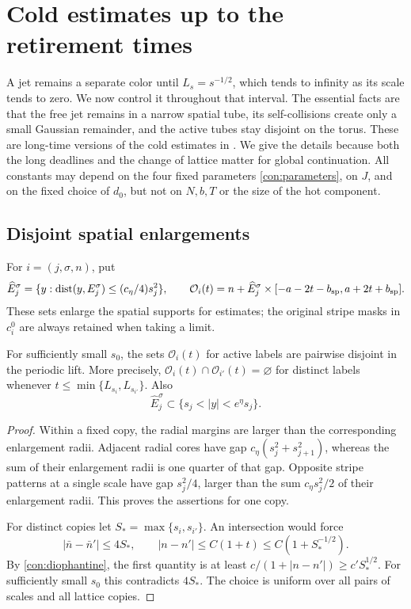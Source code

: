\section{Cold estimates up to the retirement times}
\label{sec:cold}

A jet remains a separate color until \(L_s=s^{-1/2}\), which tends to
infinity as its scale tends to zero.  We now control it throughout that
interval.  The essential facts are that the free jet remains in a
narrow spatial tube, its self-collisions create only a small Gaussian
remainder, and the active tubes stay disjoint on the torus.  These are
long-time versions of the cold estimates in
\cite[Section 4]{OpenAIPeriodic}.  We give the details because both the
long deadlines and the change of lattice matter for global continuation.
All constants may depend on the four fixed parameters
\eqref{con:parameters}, on \(J\), and on the fixed choice of \(d_0\),
but not on \(N,b,T\) or the size of the hot component.

\subsection{Disjoint spatial enlargements}

For \(i=(j,\sigma,n)\), put
\begin{equation}
 \widehat E_j^\sigma
   =\{y:\operatorname{dist}(y,E_j^\sigma)\le(c_\eta/4)s_j^2\},\qquad
 \mathcal O_i(t)=n+\widehat E_j^\sigma\times
     [-a-2t-b_{\mathrm{sp}},a+2t+b_{\mathrm{sp}}].
 \label{cold:enlargements}
\end{equation}
These sets enlarge the spatial supports for estimates; the original
stripe masks in \(c_i^0\) are always retained when taking a limit.

\begin{lemma}\label{cold:geometry}
For sufficiently small \(s_0\), the sets \(\mathcal O_i(t)\) for
active labels are pairwise disjoint in the periodic lift.  More
precisely, \(\mathcal O_i(t)\cap\mathcal O_{i'}(t)=\varnothing\)
for distinct labels whenever
\(t\le\min\{L_{s_i},L_{s_{i'}}\}\).  Also
\[
 \widehat E_j^\sigma\subset\{s_j<|y|<e^\eta s_j\}.
\]
\end{lemma}
\begin{proof}
Within a fixed copy, the radial margins are larger than the
corresponding enlargement radii.  Adjacent radial cores have gap
\(c_\eta(s_j^2+s_{j+1}^2)\), whereas the sum of their enlargement
radii is one quarter of that gap.  Opposite stripe patterns at a
single scale have gap \(s_j^2/4\), larger than the sum
\(c_\eta s_j^2/2\) of their enlargement radii.  This proves the
assertions for one copy.

For distinct copies let \(S_* =\max\{s_i,s_{i'}\}\).  An intersection
would force
\[
 |\bar n-\bar n'|\le4S_*,\qquad
 |n-n'|\le C(1+t)\le C(1+S_*^{-1/2}).
\]
By \eqref{con:diophantine}, the first quantity is at least
\(c/(1+|n-n'|)\ge c' S_*^{1/2}\).  For sufficiently small \(s_0\)
this contradicts \(4S_*\).  The choice is uniform over all pairs of
scales and all lattice copies.
\end{proof}

